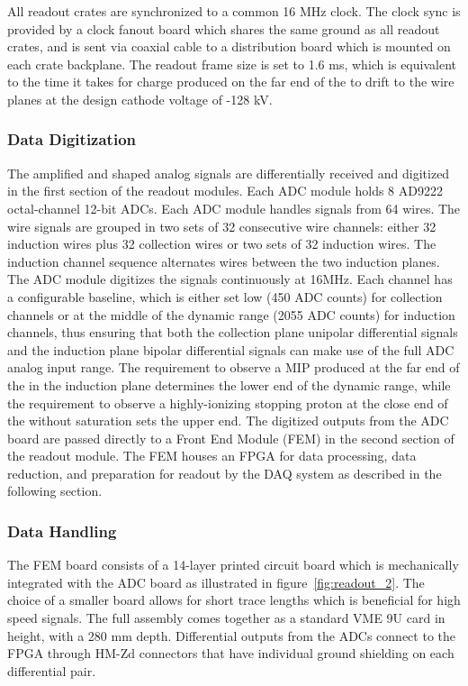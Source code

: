 All readout crates are synchronized to a common 16 MHz clock. The clock sync is provided by a clock fanout board which shares the same ground as all readout crates, and is sent via coaxial cable to a distribution board which is mounted on each crate backplane. The readout frame size is set to 1.6 ms, which is equivalent to the time it takes for charge produced on the far end of the \lartpc to drift to the wire planes at the design cathode voltage of -128 kV.

\subsubsection{\label{sssec:tpcdigitization} Data Digitization}

The amplified and shaped analog \lartpc signals are differentially received and digitized in the first section of the readout modules. Each ADC module holds 8 AD9222 octal-channel 12-bit ADCs. Each ADC module handles signals from 64 wires. The wire signals are grouped in two sets of 32 consecutive wire channels: either 32 induction wires plus 32 collection wires or two sets of 32 induction wires. The induction channel sequence alternates wires between the two induction planes. The ADC module digitizes the signals continuously at 16MHz. Each channel has a configurable baseline, which is either set low (450 ADC counts) for collection channels or at the middle of the dynamic range (2055 ADC counts) for induction channels, thus ensuring that both the collection plane unipolar differential signals and the induction plane bipolar differential signals can make use of the full ADC analog input range. The requirement to observe a MIP produced at the far end of the \lartpc in the induction plane determines the lower end of the dynamic range, while the requirement to observe a highly-ionizing stopping proton at the close end of the \lartpc without saturation sets the upper end. The digitized outputs from the ADC board are passed directly to a Front End Module (FEM) in the second section of the \lartpc readout module. The FEM houses an FPGA for data processing, data reduction, and preparation for readout by the DAQ system as described in the following section. 

\subsubsection{\label{sssec:tpcFEM} Data Handling}

The FEM board consists of a 14-layer printed circuit board which is mechanically integrated with the ADC board as illustrated in figure~\ref{fig:readout_2}. The choice of a smaller board allows for short trace lengths which is beneficial for high speed signals. The full assembly comes together as a standard VME 9U card in height, with a 280 mm depth. Differential outputs from the ADCs connect to the FPGA through HM-Zd connectors that have individual ground shielding on each differential pair. 

